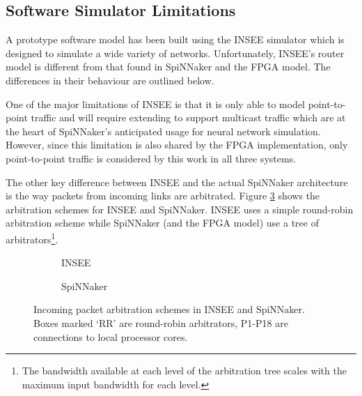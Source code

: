 		\subsection{Software Simulator Limitations}
		
			A prototype software model has been built using the INSEE simulator
			\cite{navaridas11insee} which is designed to simulate a wide variety of
			networks. Unfortunately, INSEE's router model is different from that found
			in SpiNNaker and the FPGA model. The differences in their behaviour are
			outlined below.
			
			
			One of the major limitations of INSEE is that it is only able to model
			point-to-point traffic and will require extending to support multicast
			traffic which are at the heart of SpiNNaker's anticipated usage for neural
			network simulation. However, since this limitation is also shared by the
			FPGA implementation, only point-to-point traffic is considered by this
			work in all three systems.
			
			The other key difference between INSEE and the actual SpiNNaker
			architecture is the way packets from incoming links are arbitrated. Figure
			\ref{fig:arbitration} shows the arbitration schemes for INSEE and
			SpiNNaker. INSEE uses a simple round-robin arbitration scheme while
			SpiNNaker (and the FPGA model) use a tree of arbitrators\footnote{The
			bandwidth available at each level of the arbitration tree scales with the
			maximum input bandwidth for each level.}.
			
			\begin{figure}
				\begin{subfigure}[t]{0.50\textwidth}
					\center
					
					
					\caption{INSEE}
					\label{fig:arbitrationINSEE}
				\end{subfigure}
				\begin{subfigure}[t]{0.50\textwidth}
					\center
					
					
					\caption{SpiNNaker}
					\label{fig:arbitrationSpiNNaker}
				\end{subfigure}
				
				\caption[Incoming packet arbitration schemes in INSEE and
				SpiNNaker.]{Incoming packet arbitration schemes in INSEE and SpiNNaker.
				Boxes marked `RR' are round-robin arbitrators, P1-P18 are connections to
				local processor cores.}
				\label{fig:arbitration}
			\end{figure}
			
